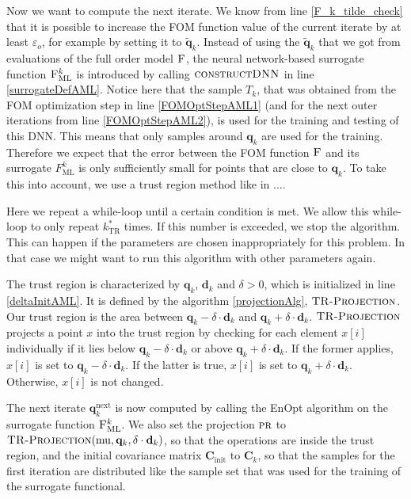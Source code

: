 Now we want to compute the next iterate. We know from line \ref{F_k_tilde_check} that it is possible to increase the FOM function value of the current iterate by at least $\varepsilon_o$, for example by setting it to $\tilde{\mathbf{q}}_k$. Instead of using the $\tilde{\mathbf{q}}_k$ that we got from evaluations of the full order model $\textproc{F}$, the neural network-based surrogate function $\textproc{F$_\mathrm{ML}^k$}$ is introduced by calling $\textproc{constructDNN}$ in line \ref{surrogateDefAML}. Notice here that the sample $T_k$, that was obtained from the FOM optimization step in line \ref{FOMOptStepAML1} (and for the next outer iterations from line \ref{FOMOptStepAML2}), is used for the training and testing of this DNN. This means that only samples around $\mathbf{q}_k$ are used for the training. Therefore we expect that the error between the FOM function $\textproc{F}$ and its surrogate $F_\mathrm{ML}^k$ is only sufficiently small for points that are close to $\mathbf{q}_k$. To take this into account, we use a trust region method like in ....

Here we repeat a while-loop until a certain condition is met. We allow this while-loop to only repeat $k^*_\mathrm{TR}$ times. If this number is exceeded, we stop the algorithm. This can happen if the parameters are chosen inappropriately for this problem. In that case we might want to run this algorithm with other parameters again.

The trust region is characterized by $\mathbf{q}_k$, $\mathbf{d}_k$ and $\delta>0$, which is initialized in line \ref{deltaInitAML}. It is defined by the algorithm \ref{projectionAlg}, $\textproc{TR-Projection}$. Our trust region is the area between $\mathbf{q}_k-\delta\cdot\mathbf{d}_k$ and $\mathbf{q}_k+\delta\cdot\mathbf{d}_k$. $\textproc{TR-Projection}$ projects a point $x$ into the trust region by checking for each element $x[i]$ individually if it lies below $\mathbf{q}_k-\delta\cdot\mathbf{d}_k$ or above $\mathbf{q}_k+\delta\cdot\mathbf{d}_k$. If the former applies, $x[i]$ is set to $\mathbf{q}_k-\delta\cdot\mathbf{d}_k$. If the latter is true, $x[i]$ is set to $\mathbf{q}_k+\delta\cdot\mathbf{d}_k$. Otherwise, $x[i]$ is not changed.

The next iterate $\mathbf{q}^\mathrm{next}_k$ is now computed by calling the EnOpt algorithm on the surrogate function $\textproc{F$_\mathrm{ML}^k$}$. We also set the projection $\textproc{pr}$ to $\Call{TR-Projection}{\mathrm{mu}, \mathbf{q}_k, \delta\cdot\mathbf{d}_k}$, so that the operations are inside the trust region, and the initial covariance matrix $\mathbf{C}_\mathrm{init}$ to $\mathbf{C}_k$, so that the samples for the first iteration are distributed like the sample set that was used for the training of the surrogate functional.

